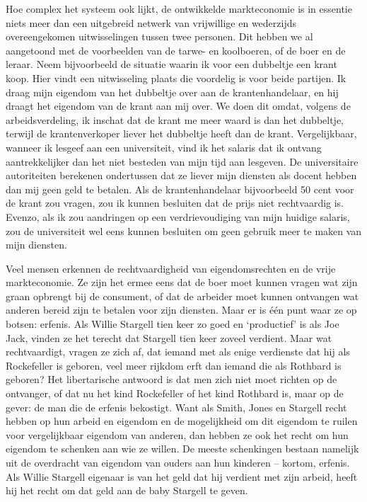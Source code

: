 \documentclass[
  a5paper,
  smalldemyvopaper,10pt,twoside,onecolumn,openright,extrafontsizes,hidelinks]{memoir}
\begin{document}
Hoe complex het systeem ook lijkt, de ontwikkelde markteconomie is in
essentie niets meer dan een uitgebreid netwerk van vrijwillige en
wederzijds overeengekomen uitwisselingen tussen twee personen. Dit
hebben we al aangetoond met de voorbeelden van de tarwe- en koolboeren,
of de boer en de leraar. Neem bijvoorbeeld de situatie waarin ik voor
een dubbeltje een krant koop. Hier vindt een uitwisseling plaats die
voordelig is voor beide partijen. Ik draag mijn eigendom van het
dubbeltje over aan de krantenhandelaar, en hij draagt het eigendom van
de krant aan mij over. We doen dit omdat, volgens de arbeidsverdeling,
ik inschat dat de krant me meer waard is dan het dubbeltje, terwijl de
krantenverkoper liever het dubbeltje heeft dan de krant. Vergelijkbaar,
wanneer ik lesgeef aan een universiteit, vind ik het salaris dat ik
ontvang aantrekkelijker dan het niet besteden van mijn tijd aan
lesgeven. De universitaire autoriteiten berekenen ondertussen dat ze
liever mijn diensten als docent hebben dan mij geen geld te betalen. Als
de krantenhandelaar bijvoorbeeld 50 cent voor de krant zou vragen, zou
ik kunnen besluiten dat de prijs niet rechtvaardig is. Evenzo, als ik
zou aandringen op een verdrievoudiging van mijn huidige salaris, zou de
universiteit wel eens kunnen besluiten om geen gebruik meer te maken van
mijn diensten.

Veel mensen erkennen de rechtvaardigheid van eigendomsrechten en de
vrije markteconomie. Ze zijn het ermee eens dat de boer moet kunnen
vragen wat zijn graan opbrengt bij de consument, of dat de arbeider moet
kunnen ontvangen wat anderen bereid zijn te betalen voor zijn diensten.
Maar er is één punt waar ze op botsen: erfenis. Als Willie Stargell tien
keer zo goed en `productief' is als Joe Jack, vinden ze het terecht dat
Stargell tien keer zoveel verdient. Maar wat rechtvaardigt, vragen ze
zich af, dat iemand met als enige verdienste dat hij als Rockefeller is
geboren, veel meer rijkdom erft dan iemand die als Rothbard is geboren?
Het libertarische antwoord is dat men zich niet moet richten op de
ontvanger, of dat nu het kind Rockefeller of het kind Rothbard is, maar
op de gever: de man die de erfenis bekostigt. Want als Smith, Jones en
Stargell recht hebben op hun arbeid en eigendom en de mogelijkheid om
dit eigendom te ruilen voor vergelijkbaar eigendom van anderen, dan
hebben ze ook het recht om hun eigendom te schenken aan wie ze willen.
De meeste schenkingen bestaan namelijk uit de overdracht van eigendom
van ouders aan hun kinderen -- kortom, erfenis. Als Willie Stargell
eigenaar is van het geld dat hij verdient met zijn arbeid, heeft hij het
recht om dat geld aan de baby Stargell te geven.
\end{document}
